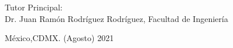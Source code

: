 \documentclass[12pt, oneside]{book}
\begin{document}
\begin{titlepage}
\begin{center}
\begin{center}
				\bigskip
				
				Tutor Principal: \\
				Dr. Juan Ram\'on Rodr\'iguez Rodr\'iguez, Facultad de Ingenier\'ia\\
			\end{center}
			
			\vfill
			
			\begin{center}
				{México,CDMX. (Agosto) 2021}\\
			\end{center}
			\cleardoublepage
		\end{center}
	\end{titlepage}
\end{document}
